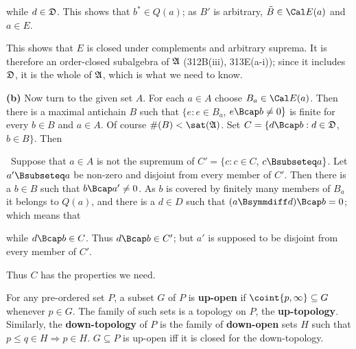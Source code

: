 {\noindent while $d\in\frak D$.    This shows that
$b^*\in Q(a)$;  as $B'$ is arbitrary, $\tilde B\in\Cal E(a)$ and $a\in E$.

This shows that $E$ is closed under complements and arbitrary suprema.
It is therefore an order-closed subalgebra of $\frak A$ (312B(iii),
313E(a-i));  since it
includes $\frak D$, it is the whole of $\frak A$, which is what we need
to know.\ \Qed

\medskip

{\bf (b)} Now turn to the given set $A$.   For each $a\in A$ choose
$B_a\in\Cal E(a)$.   Then there is a maximal antichain $B$ such that
$\{e:e\in B_a$, $e\Bcap b\ne 0\}$ is finite for every $b\in B$ and
$a\in A$.   Of course $\#(B)<\sat(\frak A)$.   Set
$C=\{d\Bcap b:d\in\frak D$, $b\in B\}$.   Then


\noindent\Quer\ Suppose that $a\in A$ is not the supremum of
$C'=\{c:c\in C$, $c\Bsubseteq a\}$.   Let $a'\Bsubseteq a$ be non-zero
and disjoint from every member of $C'$.   Then there is a $b\in B$ such
that $b\Bcap a'\ne 0$.   As $b$ is covered by finitely many members of
$B_a$ it belongs to $Q(a)$, and there is a $d\in D$ such that
$(a\Bsymmdiff d)\Bcap b=0$;  which means that


\noindent while $d\Bcap b\in C$.   Thus $d\Bcap b\in C'$;  but $a'$ is
supposed to be disjoint from every member of $C'$.\ \Bang

Thus $C$ has the properties we need.
}%

 For any pre-ordered set $P$, a subset
$G$ of $P$ is {\bf up-open} if $\coint{p,\infty}\subseteq G$ whenever
$p\in G$.   The family of such sets is a topology on $P$, the
{\bf up-topology}.   Similarly, the {\bf down-topology} of $P$ is the
family of
{\bf down-open} sets $H$ such that $p\le q\in H\Rightarrow p\in H$.
 $G\subseteq P$ is up-open iff it is closed for the
down-topology.

